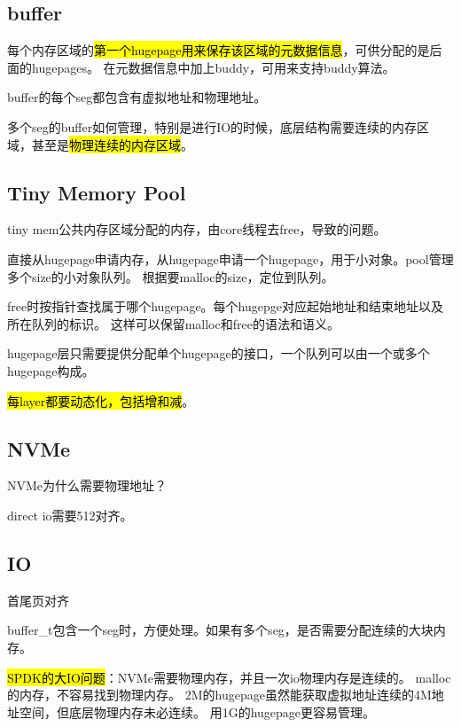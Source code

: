 \subsection{buffer}


每个内存区域的\hl{第一个hugepage用来保存该区域的元数据信息}，可供分配的是后面的hugepages。
在元数据信息中加上buddy，可用来支持buddy算法。

buffer的每个seg都包含有虚拟地址和物理地址。

多个seg的buffer如何管理，特别是进行IO的时候，底层结构需要连续的内存区域，甚至是\hl{物理连续的内存区域}。

\subsection{Tiny Memory Pool}


tiny mem公共内存区域分配的内存，由core线程去free，导致的问题。

直接从hugepage申请内存，从hugepage申请一个hugepage，用于小对象。pool管理多个size的小对象队列。
根据要malloc的size，定位到队列。

free时按指针查找属于哪个hugepage。每个hugepge对应起始地址和结束地址以及所在队列的标识。
这样可以保留malloc和free的语法和语义。

hugepage层只需要提供分配单个hugepage的接口，一个队列可以由一个或多个hugepage构成。


\hl{每layer都要动态化，包括增和减}。

\subsection{NVMe}

NVMe为什么需要物理地址？

direct io需要512对齐。

\subsection{IO}


首尾页对齐 

buffer\_t包含一个seg时，方便处理。如果有多个seg，是否需要分配连续的大块内存。

\hl{SPDK的大IO问题}：NVMe需要物理内存，并且一次io物理内存是连续的。
malloc的内存，不容易找到物理内存。
2M的hugepage虽然能获取虚拟地址连续的4M地址空间，但底层物理内存未必连续。
用1G的hugepage更容易管理。

